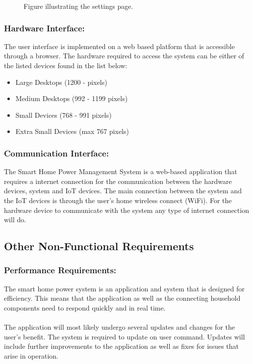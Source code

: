 \documentclass[10pt,twocolumn]{witseiepaper}
\begin{document}
\begin{itemize}
\begin{figure}[!h]
			\caption{Figure illustrating the settings page.}
			\label{Settings}
		\end{figure}
	\end{itemize}
	
	\subsubsection{Hardware Interface:}
	The user interface is implemented on a web based platform that is accessible through a browser. The hardware required to access the system can be either of the listed devices found in the list below:
	
	\begin{itemize}
		\item Large Desktops (1200 -  pixels)
		\item Medium Desktops (992 - 1199 pixels)
		\item Small Devices (768 - 991 pixels)
		\item Extra Small Devices (max 767 pixels)
	\end{itemize}
	
	\subsubsection{Communication Interface:}
	The Smart Home Power Management System is a web-based application that requires a internet connection for the communication between the hardware devices, system and IoT devices. The main connection between the system and the IoT devices is through the user's home wireless connect (WiFi). For the hardware device to communicate with the system any type of internet connection will do.
	
	\subsection{Other Non-Functional Requirements}
	
	\subsubsection{Performance Requirements:}
	The smart home power system is an application and system that is designed for efficiency. This means that the application as well as the connecting household components need to respond quickly and in real time. 
	\\\\
	The application will most likely undergo several updates and changes for the user's benefit. The system is required to update on user command. Updates will include further improvements to the application as well as fixes for issues that arise in operation.
	
\end{document}
